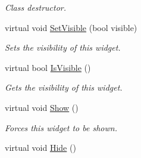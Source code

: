 \begin{DoxyCompactItemize}
\begin{DoxyCompactList}\small\item\em Class destructor. \item\end{DoxyCompactList}\item 
virtual void \hyperlink{classphys_1_1UI_1_1DropDownList_ac86730fe238d990505667bb9a475fb77}{SetVisible} (bool visible)
\begin{DoxyCompactList}\small\item\em Sets the visibility of this widget. \item\end{DoxyCompactList}\item 
virtual bool \hyperlink{classphys_1_1UI_1_1DropDownList_ae4bd94c8f891dadf2423cef16c28e3f9}{IsVisible} ()
\begin{DoxyCompactList}\small\item\em Gets the visibility of this widget. \item\end{DoxyCompactList}\item 
\hypertarget{classphys_1_1UI_1_1DropDownList_aa30bdfe138516a0f51efa2034cd9f595}{
virtual void \hyperlink{classphys_1_1UI_1_1DropDownList_aa30bdfe138516a0f51efa2034cd9f595}{Show} ()}
\label{classphys_1_1UI_1_1DropDownList_aa30bdfe138516a0f51efa2034cd9f595}

\begin{DoxyCompactList}\small\item\em Forces this widget to be shown. \item\end{DoxyCompactList}\item 
\hypertarget{classphys_1_1UI_1_1DropDownList_a919966f2143ad3fd967b6e17092891b3}{
virtual void \hyperlink{classphys_1_1UI_1_1DropDownList_a919966f2143ad3fd967b6e17092891b3}{Hide} ()}
\label{classphys_1_1UI_1_1DropDownList_a919966f2143ad3fd967b6e17092891b3}


\end{DoxyCompactItemize}
